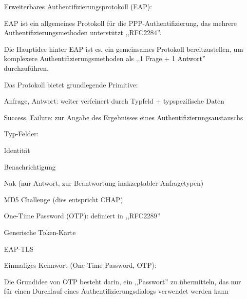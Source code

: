 \documentclass[a4paper]{article}
\begin{document}
\begin{multicols}{3}
\begin{itemize*}
\begin{itemize*}
            \end{itemize*}
            \item Erweiterbares Authentifizierungsprotokoll (EAP):
            \begin{itemize*}
                  \item EAP ist ein allgemeines Protokoll für die PPP-Authentifizierung, das mehrere Authentifizierungsmethoden unterstützt ,,RFC2284''.
                  \item Die Hauptidee hinter EAP ist es, ein gemeinsames Protokoll bereitzustellen, um komplexere Authentifizierungsmethoden als ,,1 Frage + 1 Antwort'' durchzuführen.
                  \item Das Protokoll bietet grundlegende Primitive:
                  \begin{itemize*}
                        \item Anfrage, Antwort: weiter verfeinert durch Typfeld + typspezifische Daten
                        \item Success, Failure: zur Angabe des Ergebnisses eines Authentifizierungsaustauschs
                  \end{itemize*}
                  \item Typ-Felder:
                  \begin{itemize*}
                        \item Identität
                        \item Benachrichtigung
                        \item Nak (nur Antwort, zur Beantwortung inakzeptabler Anfragetypen)
                        \item MD5 Challenge (dies entspricht CHAP)
                        \item One-Time Password (OTP): definiert in ,,RFC2289''
                        \item Generische Token-Karte
                        \item EAP-TLS
                  \end{itemize*}
            \end{itemize*}
            \item Einmaliges Kennwort (One-Time Password, OTP):
            \begin{itemize*}
                  \item Die Grundidee von OTP besteht darin, ein ,,Passwort'' zu übermitteln, das nur für einen Durchlauf eines Authentifizierungsdialogs verwendet werden kann

\end{itemize*}
\end{itemize*}
\end{multicols}
\end{document}
